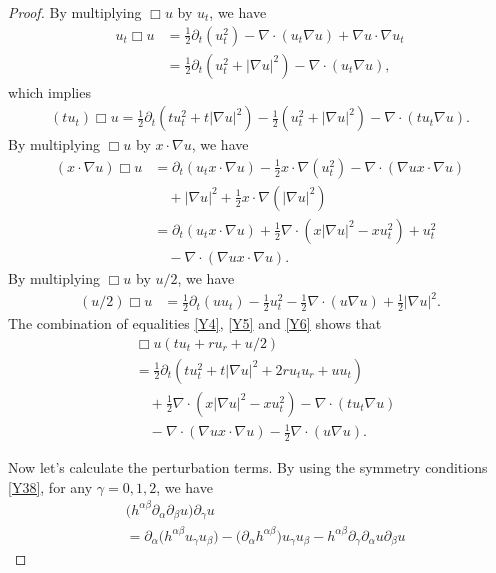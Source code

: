 \documentclass[11pt, reqno]{amsart}
\theoremstyle{definition}
\theoremstyle{remark}
\theoremstyle{definition}
\numberwithin{equation}{section}
\numberwithin{equation}{section}
\begin{document}
\begin{proof}
By multiplying $\Box u$ by $u_t$, we have
\begin{align}\label{Y3}
u_t\Box u&=\frac12\partial_t(u_t^2)-\nabla\cdot(u_t\nabla
u)+\nabla u\cdot\nabla u_t
\nonumber\\&=\frac12\partial_t(u_t^2+|\nabla
u|^2)-\nabla\cdot(u_t\nabla u),
\end{align}
which implies
\begin{align}\label{Y4}
(tu_t)\Box u=\frac12\partial_t(tu_t^2+t|\nabla
u|^2)-\frac12(u_t^2+|\nabla u|^2)-\nabla\cdot(tu_t\nabla u).
\end{align}
By multiplying $\Box u$ by $x\cdot\nabla u$, we have
\begin{align}\label{Y5}
(x\cdot\nabla u)\Box u&=\partial_t(u_tx\cdot\nabla
u)-\frac12x\cdot\nabla(u_t^2)-\nabla\cdot(\nabla ux\cdot\nabla u)
\nonumber\\&\quad+|\nabla u|^2+\frac12x\cdot\nabla(|\nabla u|^2)
\nonumber\\&=\partial_t(u_tx\cdot\nabla
u)+\frac12\nabla\cdot(x|\nabla
u|^2-xu_t^2)+u_t^2\nonumber\\&\quad-\nabla\cdot(\nabla ux\cdot\nabla
u).
\end{align}
By multiplying $\Box u$ by $u/2$, we have
\begin{align}\label{Y6}
(u/2)\Box
u&=\frac12\partial_t(uu_t)-\frac12u_t^2-\frac12\nabla\cdot(u\nabla
u)+\frac12|\nabla u|^2.
\end{align}
The combination of equalities \eqref{Y4}, \eqref{Y5} and \eqref{Y6}
shows that
\begin{align}\label{Y7}
&\Box
u(tu_t+ru_r+u/2)\nonumber\\&=\frac12\partial_t(tu_t^2+t|\nabla
u|^2+2ru_tu_r+uu_t)\nonumber\\&\quad+\frac12\nabla\cdot(x|\nabla
u|^2-xu_t^2)-\nabla\cdot(tu_t\nabla
u)\nonumber\\&\quad-\nabla\cdot(\nabla ux\cdot\nabla
u)-\frac12\nabla\cdot(u\nabla u).
\end{align}
\par Now let's calculate the perturbation terms. By using the symmetry conditions \eqref{Y38}, for any $\gamma=0,1,2$, we have
\begin{align*}
&\big(h^{\alpha\beta}\partial_{\alpha}\partial_{\beta}u\big)\partial_{\gamma}u
\\&=\partial_{\alpha}\big(h^{\alpha\beta}u_{\gamma}u_{\beta}\big)
-\big(\partial_{\alpha}h^{\alpha\beta}\big)u_{\gamma}u_{\beta}-h^{\alpha\beta}\partial_{\gamma}\partial_{\alpha}u\partial_{\beta}u

\end{align*}
\end{proof}
\end{document}
